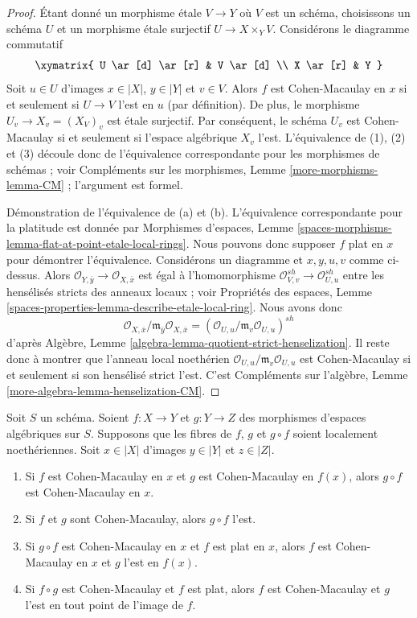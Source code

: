 \begin{proof}
Étant donné un morphisme étale $V \to Y$ où $V$ est un schéma,
choisissons un schéma $U$ et un morphisme étale surjectif $U \to X \times_Y V$.
Considérons le diagramme commutatif
$$
\xymatrix{
U \ar[d] \ar[r] & V \ar[d] \\
X \ar[r] & Y
}
$$
Soit $u \in U$ d'images $x \in |X|$, $y \in |Y|$ et $v \in V$.
Alors $f$ est Cohen-Macaulay en $x$ si et seulement si $U \to V$ l'est
en $u$ (par définition). De plus, le morphisme
$U_v \to X_v = (X_V)_v$ est étale surjectif. Par conséquent, le schéma $U_v$ est
Cohen-Macaulay si et seulement si l'espace algébrique $X_v$ l'est.
L'équivalence de (1), (2) et (3) découle donc de
l'équivalence correspondante pour les morphismes de
schémas ; voir Compléments sur les morphismes, Lemme \ref{more-morphisms-lemma-CM} ;
l'argument est formel.

\medskip\noindent
Démonstration de l'équivalence de (a) et (b). L'équivalence correspondante
pour la platitude est donnée par Morphismes d'espaces, Lemme
\ref{spaces-morphisms-lemma-flat-at-point-etale-local-rings}.
Nous pouvons donc supposer $f$ plat en $x$ pour démontrer l'équivalence.
Considérons un diagramme et $x, y, u, v$ comme ci-dessus. Alors
$\mathcal{O}_{Y, \overline{y}} \to \mathcal{O}_{X, \overline{x}}$
est égal à l'homomorphisme
$\mathcal{O}_{V, v}^{sh} \to \mathcal{O}_{U, u}^{sh}$
entre les hensélisés stricts des anneaux locaux ; voir
Propriétés des espaces, Lemme
\ref{spaces-properties-lemma-describe-etale-local-ring}.
Nous avons donc
$$
\mathcal{O}_{X, \overline{x}}/
\mathfrak m_{\overline{y}}\mathcal{O}_{X, \overline{x}} =
(\mathcal{O}_{U, u}/\mathfrak m_v \mathcal{O}_{U, u})^{sh}
$$
d'après Algèbre, Lemme \ref{algebra-lemma-quotient-strict-henselization}.
Il reste donc à montrer que l'anneau local noethérien
$\mathcal{O}_{U, u}/\mathfrak m_v \mathcal{O}_{U, u}$
est Cohen-Macaulay si et seulement si son hensélisé strict l'est.
C'est Compléments sur l'algèbre, Lemme \ref{more-algebra-lemma-henselization-CM}.
\end{proof}

\begin{lemma}
\label{lemma-composition-CM}
Soit $S$ un schéma.
Soient $f : X \to Y$ et $g : Y \to Z$ des morphismes d'espaces algébriques
sur $S$. Supposons que les
fibres de $f$, $g$ et $g \circ f$ soient localement noethériennes.
Soit $x \in |X|$ d'images $y \in |Y|$ et $z \in |Z|$.
\begin{enumerate}
\item Si $f$ est Cohen-Macaulay en $x$ et $g$ est Cohen-Macaulay
en $f(x)$, alors $g \circ f$ est Cohen-Macaulay en $x$.
\item Si $f$ et $g$ sont Cohen-Macaulay, alors $g \circ f$ l'est.
\item Si $g \circ f$ est Cohen-Macaulay en $x$ et $f$ est plat en $x$,
alors $f$ est Cohen-Macaulay en $x$ et $g$ l'est en $f(x)$.
\item Si $f \circ g$ est Cohen-Macaulay et $f$ est plat, alors
$f$ est Cohen-Macaulay et $g$ l'est en tout point de
l'image de $f$.
\end{enumerate}
\end{lemma}

